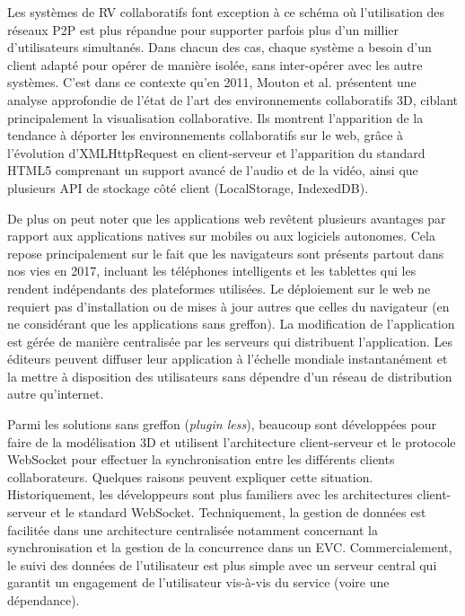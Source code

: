 Les systèmes de \gls{RV} collaboratifs font exception à ce schéma où l'utilisation 
des réseaux \gls{P2P} est plus répandue pour supporter parfois plus d'un millier 
d'utilisateurs simultanés. 
Dans chacun des cas, chaque système a besoin d'un client adapté pour opérer de 
manière isolée, sans inter-opérer avec les autre systèmes. 
C'est dans ce contexte qu'en 2011, Mouton et al. \cite{Mouton2011} présentent 
une analyse approfondie de l'état de l'art des environnements collaboratifs 3D, ciblant 
principalement la visualisation collaborative. 
Ils montrent l'apparition de la tendance à déporter les environnements collaboratifs 
sur le web, grâce à l'évolution d'XMLHttpRequest en client-serveur et l'apparition 
du standard HTML5 comprenant un support avancé de l'audio et de la vidéo, ainsi 
que plusieurs \gls{API} de stockage côté client (LocalStorage, IndexedDB). 

De plus on peut noter que les applications web revêtent plusieurs avantages par rapport aux applications 
natives sur mobiles ou aux logiciels autonomes. 
Cela repose principalement sur le fait que les navigateurs sont présents partout 
dans nos vies en 2017, incluant les téléphones intelligents et les 
tablettes qui les rendent indépendants des plateformes utilisées. 
Le déploiement sur le web ne requiert pas d'installation ou de mises à jour autres 
que celles du navigateur (en ne considérant que les applications sans greffon). 
La modification de l'application est gérée de manière centralisée par les serveurs 
qui distribuent l'application. 
Les éditeurs peuvent diffuser leur application à l'échelle mondiale instantanément  
et la mettre à disposition des utilisateurs sans dépendre d'un réseau de distribution 
autre qu'internet.


Parmi les solutions sans greffon (\textit{plugin less}), beaucoup sont développées 
pour faire de la modélisation 3D et utilisent l'architecture client-serveur et le 
protocole \gls{WebSocket} pour effectuer la synchronisation entre les différents 
clients collaborateurs. Quelques raisons peuvent expliquer cette situation. 
Historiquement, les développeurs sont plus familiers avec les architectures 
client-serveur et le standard \gls{WebSocket}. Techniquement, la gestion de 
données est facilitée dans une architecture centralisée notamment concernant la 
synchronisation et la gestion de la concurrence dans un \gls{EVC}. 
Commercialement, le suivi des données de l'utilisateur est plus simple avec un 
serveur central qui garantit un engagement de l'utilisateur vis-à-vis du service 
(voire une dépendance).



